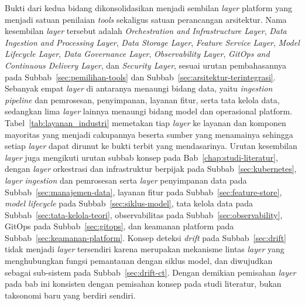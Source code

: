 Bukti dari kedua bidang dikonsolidasikan menjadi sembilan \textit{layer} platform yang menjadi satuan penilaian \textit{tools} sekaligus satuan perancangan arsitektur. Nama kesembilan \textit{layer} tersebut adalah \textit{Orchestration and Infrastructure Layer}, \textit{Data Ingestion and Processing Layer}, \textit{Data Storage Layer}, \textit{Feature Service Layer}, \textit{Model Lifecycle Layer}, \textit{Data Governance Layer}, \textit{Observability Layer}, \textit{GitOps and Continuous Delivery Layer}, dan \textit{Security Layer}, sesuai urutan pembahasannya pada Subbab~\ref{sec:pemilihan-tools} dan Subbab~\ref{sec:arsitektur-terintegrasi}. Sebanyak empat \textit{layer} di antaranya menaungi bidang data, yaitu \textit{ingestion pipeline} dan pemrosesan, penyimpanan, layanan fitur, serta tata kelola data, sedangkan lima \textit{layer} lainnya menaungi bidang model dan operasional platform. Tabel~\ref{tab:layanan_industri} memetakan tiap \textit{layer} ke layanan dan komponen mayoritas yang menjadi cakupannya beserta sumber yang menamainya sehingga setiap \textit{layer} dapat dirunut ke bukti terbit yang mendasarinya. Urutan kesembilan \textit{layer} juga mengikuti urutan subbab konsep pada Bab~\ref{chap:studi-literatur}, dengan \textit{layer} orkestrasi dan infrastruktur berpijak pada Subbab~\ref{sec:kubernetes}, \textit{layer} \textit{ingestion} dan pemrosesan serta \textit{layer} penyimpanan data pada Subbab~\ref{sec:manajemen-data}, layanan fitur pada Subbab~\ref{sec:feature-store}, \textit{model lifecycle} pada Subbab~\ref{sec:siklus-model}, tata kelola data pada Subbab~\ref{sec:tata-kelola-teori}, observabilitas pada Subbab~\ref{sec:observability}, GitOps pada Subbab~\ref{sec:gitops}, dan keamanan platform pada Subbab~\ref{sec:keamanan-platform}. Konsep deteksi \textit{drift} pada Subbab~\ref{sec:drift} tidak menjadi \textit{layer} tersendiri karena merupakan mekanisme lintas \textit{layer} yang menghubungkan fungsi pemantauan dengan siklus model, dan diwujudkan sebagai sub-sistem pada Subbab~\ref{sec:drift-ct}. Dengan demikian pemisahan \textit{layer} pada bab ini konsisten dengan pemisahan konsep pada studi literatur, bukan taksonomi baru yang berdiri sendiri.



